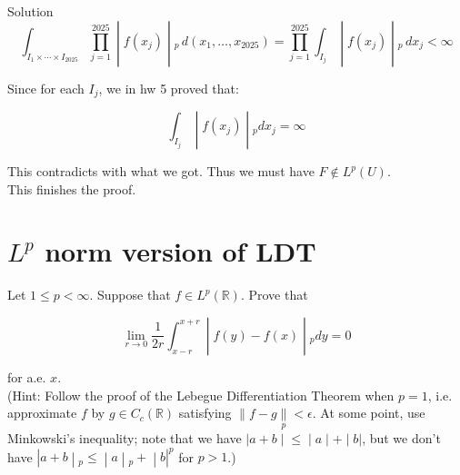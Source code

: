 \documentclass{qlnotes-export}
\begin{document}
\begin{qlsolution}{Solution}
\[\left. \int_{I_{1} \times \cdots \times I_{2025}}\prod\limits_{j = 1}^{2025} \middle| f(x_{j}) \middle| {}_{p}\, d(x_{1},\ldots,x_{2025}) = \prod\limits_{j = 1}^{2025}\int_{I_{j}} \middle| f(x_{j}) \middle| {}_{p}\, dx_{j} < \infty \right.\]

Since for each \(I_{j}\), we in hw 5 proved that:

\[\left. \int_{I_{j}} \middle| f(x_{j}) \middle| {}_{p} dx_{j} = \infty \right.\]

This contradicts with what we got. Thus we must have \(F \notin L^{p}(U)\).\\
This finishes the proof.

\end{qlsolution}

\section{\texorpdfstring{\(L^{p}\) norm version of LDT}{L\^{}\{p\} norm version of LDT}}\label{lp-norm-version-of-ldt}

Let \(1 \leq p < \infty\). Suppose that \(f \in L^{p}({\mathbb{R}})\). Prove that

\[\left. \lim\limits_{r\rightarrow 0}\frac{1}{2r}\int_{x - r}^{x + r} \middle| f(y) - f(x) \middle| {}_{p} dy = 0 \right.\]

for a.e. \(x\).\\
(Hint: Follow the proof of the Lebegue Differentiation Theorem when \(p = 1\), i.e. approximate \(f\) by \(g \in C_{c}({\mathbb{R}})\) satisfying \(\parallel f - g\underset{p}{\parallel} < \epsilon\). At some point, use Minkowski's inequality; note that we have \(\left. |a + b \middle| \leq \middle| a \middle| + \middle| b| \right.\), but we don't have \(\left. |a + b \middle| {}_{p} \leq \middle| a \middle| {}_{p} + \middle| b|^{p} \right.\) for \(p > 1\).)
\end{document}

